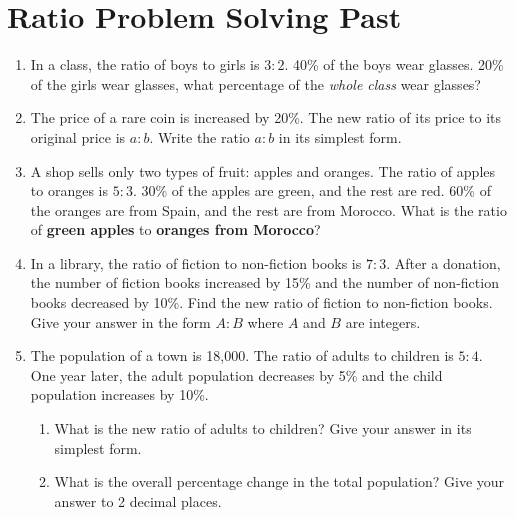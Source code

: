 \documentclass[12pt,a4paper]{article}
\begin{document}
\vspace{1cm}

\section*{Ratio Problem Solving Past}
\begin{enumerate}[start=21]

    \item In a class, the ratio of boys to girls is $3:2$. 40\% of the boys wear glasses. 20\% of the girls wear glasses, what percentage of the \textit{whole class} wear glasses?

    \item The price of a rare coin is increased by 20\%. The new ratio of its price to its original price is $a : b$. Write the ratio $a:b$ in its simplest form.

    \item A shop sells only two types of fruit: apples and oranges. The ratio of apples to oranges is $5:3$. 30\% of the apples are green, and the rest are red. 60\% of the oranges are from Spain, and the rest are from Morocco. What is the ratio of \textbf{green apples} to \textbf{oranges from Morocco}?

    \item In a library, the ratio of fiction to non-fiction books is $7:3$. After a donation, the number of fiction books increased by 15\% and the number of non-fiction books decreased by 10\%. Find the new ratio of fiction to non-fiction books. Give your answer in the form $A:B$ where $A$ and $B$ are integers.

    \item The population of a town is 18,000. The ratio of adults to children is $5:4$. One year later, the adult population decreases by 5\% and the child population increases by 10\%.
    \begin{enumerate}[label=(\alph*)]
        \item What is the new ratio of adults to children? Give your answer in its simplest form.
        \item What is the overall percentage change in the total population? Give your answer to 2 decimal places.
    \end{enumerate}

\end{enumerate}

\newpage{}
\end{document}

